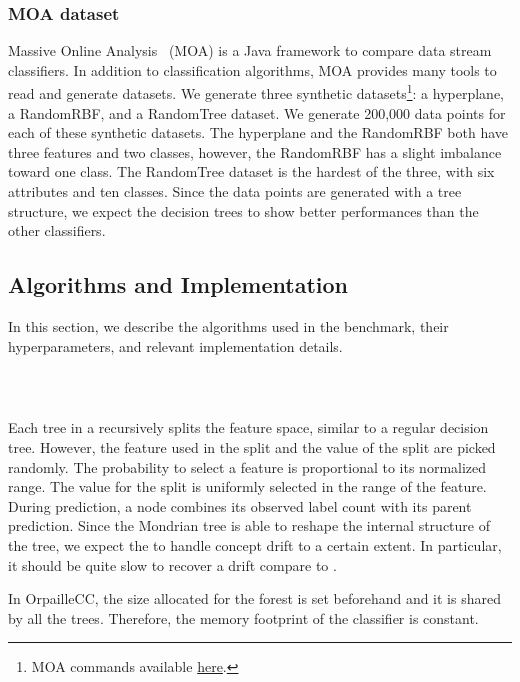 \subsubsection{MOA dataset}
Massive Online Analysis~\cite{moa} (MOA) is a Java framework to compare
data stream classifiers. In addition to classification algorithms, MOA provides many
tools to read and generate datasets.
We generate three synthetic datasets\footnote{MOA commands available \href{https://github.com/azazel7/paper-benchmark/blob/e0c9a94d0d17490f7ab14293dec20b8322a6447c/Makefile\#L90}{here}.}:
a hyperplane, a RandomRBF, and a RandomTree
dataset. We generate 200,000 data points
 for each of these synthetic datasets.
The hyperplane and the RandomRBF both have three features and two classes, however, the RandomRBF has a slight imbalance toward one class.
The RandomTree dataset is the hardest of the three, with six attributes and
ten classes. Since the data points are generated with a tree structure, we
expect the decision trees to show better performances than the other
classifiers.

\subsection{Algorithms and Implementation}
In this section, we describe the algorithms used in the benchmark, their
hyperparameters, and relevant implementation details. 

\subsubsection{\mondrianforest~\cite{mondrian2014}}
Each tree in a \mondrianforest recursively splits
the feature space, similar to a regular decision tree.
However, the feature used in the split and the
value of the split are picked randomly. The
probability to select a feature is proportional to
its normalized range. The value for the split is
uniformly selected in the range of the feature.
During prediction, a node combines its observed
label count with its parent prediction. Since the
Mondrian tree is able to reshape the internal
structure of the tree, we expect the
\mondrianforest to handle concept drift to a
certain extent. In particular, it should be quite
slow to recover a drift compare to \mcnn.

In OrpailleCC, the size allocated for the forest
is set beforehand and it is shared by all
the trees.  Therefore, the memory footprint of the
classifier is constant.

